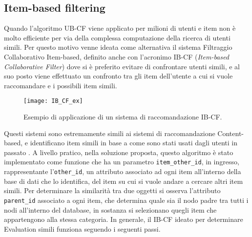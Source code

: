\subsection{Item-based filtering}
Quando l'algoritmo UB-CF viene applicato per milioni di utenti e item non è molto efficiente per via della complessa computazione della 
ricerca di utenti simili. Per questo motivo venne ideata come alternativa il sistema Filtraggio Collaborativo Item-based, 
definito anche con l'acronimo IB-CF (\textit{Item-based Collaborative Filter}) dove si è preferito evitare di confrontare utenti 
simili, e al suo posto viene effettuato un confronto tra gli item dell'utente a cui si vuole raccomandare e i possibili item simili.
%
\begin{figure}[ht!]
    \centering
    \texttt{[image: IB\_CF\_ex]}
    \caption[Applicazione di un sistema di raccomandazione IB-CF]{Esempio di applicazione di un sistema di raccomandazione IB-CF.}
    \label{fig:IB_CF}
\end{figure}
\hfill\break
Questi sistemi sono estremamente simili ai sistemi di raccomandazione Content-based, e identificano item simili in base a come sono 
stati usati dagli utenti in passato \cite{item-based-collaborative-filtering}.\hfill\break
A livello pratico, nella soluzione proposta, questo algoritmo è stato implementato come funzione che ha un 
parametro \texttt{item\_other\_id}, in ingresso, rappresentante l'\texttt{other\_id}, un attributo associato ad ogni item all'interno della base di dati 
che lo identifica, del item su cui si vuole andare a cercare altri item simili. Per determinare la similarità tra due oggetti si osserva 
l'attributo \texttt{parent\_id} associato a ogni item, che determina quale sia il nodo padre tra tutti i nodi all'interno del database, in sostanza 
si selezionano quegli item che appartengono alla stessa categoria.\hfill\break
In generale, il IB-CF ideato per determinare Evaluation simili funziona seguendo i seguenti passi.
